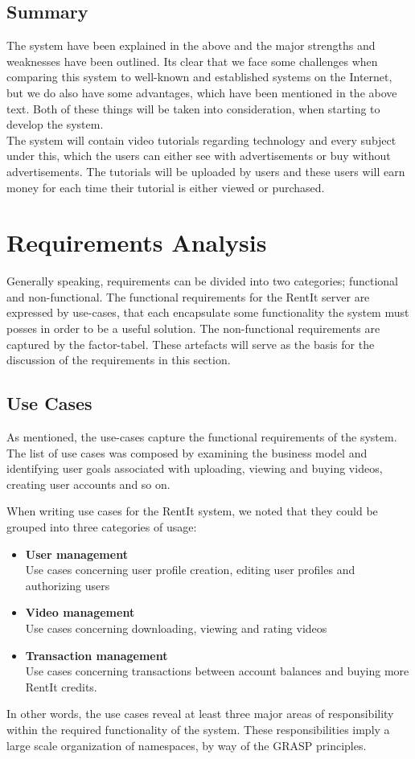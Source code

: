 \subsection{Summary}
The system have been explained in the above and the major strengths and weaknesses have been outlined. Its clear that we face some challenges when comparing this system to well-known and established systems on the Internet, but we do also have some advantages, which have been mentioned in the above text. Both of these things will be taken into consideration, when starting to develop the system.\\
The system will contain video tutorials regarding technology and every subject under this, which the users can either see with advertisements or buy without advertisements. The tutorials will be uploaded by users and these users will earn money for each time their tutorial is either viewed or purchased.\\

\section{Requirements Analysis}
Generally speaking, requirements can be divided into two categories; functional and non-functional. The functional requirements for the RentIt server are expressed by use-cases, that each encapsulate some functionality the system must posses in order to be a useful solution. The non-functional requirements are captured by the factor-tabel.
  These artefacts will serve as the basis for the discussion of the requirements in this section.
\subsection{Use Cases}
As mentioned, the use-cases capture the functional requirements of the system. The list of use cases was composed by examining the business model and identifying user goals associated with uploading, viewing and buying videos, creating user accounts and so on.

When writing use cases for the RentIt system, we noted that they could be grouped into three categories of usage:
\begin{itemize}
\item \textbf{User management}\\
Use cases concerning user profile creation, editing user profiles and authorizing users
\item \textbf{Video management}\\
Use cases concerning downloading, viewing and rating videos
\item \textbf{Transaction management}\\
Use cases concerning transactions between account balances and buying more RentIt credits.
\end{itemize}
In other words, the use cases reveal at least three major areas of responsibility within the required functionality of the system. These responsibilities imply a large scale organization of namespaces, by way of the GRASP principles.

